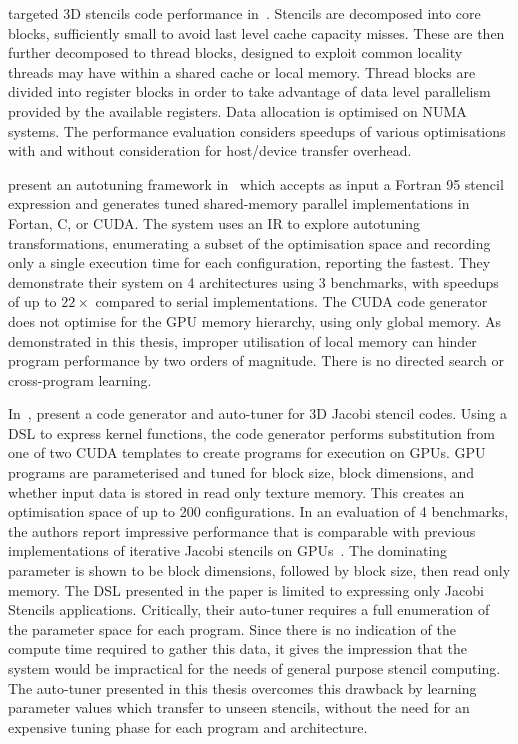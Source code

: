 \citeauthor{Berkeley2009} targeted 3D stencils code performance
in~\cite{Berkeley2009}. Stencils are decomposed into core blocks,
sufficiently small to avoid last level cache capacity misses. These
are then further decomposed to thread blocks, designed to exploit
common locality threads may have within a shared cache or local
memory. Thread blocks are divided into register blocks in order to
take advantage of data level parallelism provided by the available
registers. Data allocation is optimised on NUMA systems. The
performance evaluation considers speedups of various optimisations
with and without consideration for host/device transfer overhead.

\citeauthor{Kamil2010} present an autotuning framework
in~\cite{Kamil2010} which accepts as input a Fortran 95 stencil
expression and generates tuned shared-memory parallel implementations
in Fortan, C, or CUDA. The system uses an IR to explore autotuning
transformations, enumerating a subset of the optimisation space and
recording only a single execution time for each configuration,
reporting the fastest. They demonstrate their system on 4
architectures using 3 benchmarks, with speedups of up to $22\times$
compared to serial implementations. The CUDA code generator does not
optimise for the GPU memory hierarchy, using only global memory. As
demonstrated in this thesis, improper utilisation of local memory can
hinder program performance by two orders of magnitude. There is no
directed search or cross-program learning.

In~\cite{Zhang2013a}, \citeauthor{Zhang2013a} present a code generator
and auto-tuner for 3D Jacobi stencil codes. Using a DSL to express
kernel functions, the code generator performs substitution from one of
two CUDA templates to create programs for execution on GPUs. GPU
programs are parameterised and tuned for block size, block dimensions,
and whether input data is stored in read only texture memory. This
creates an optimisation space of up to 200 configurations. In an
evaluation of 4 benchmarks, the authors report impressive performance
that is comparable with previous implementations of iterative Jacobi
stencils on GPUs~\cite{Holewinski2012, Phillips2010}. The dominating
parameter is shown to be block dimensions, followed by block size,
then read only memory. The DSL presented in the paper is limited to
expressing only Jacobi Stencils applications. Critically, their
auto-tuner requires a full enumeration of the parameter space for each
program. Since there is no indication of the compute time required to
gather this data, it gives the impression that the system would be
impractical for the needs of general purpose stencil computing. The
auto-tuner presented in this thesis overcomes this drawback by learning
parameter values which transfer to unseen stencils, without the need
for an expensive tuning phase for each program and architecture.

